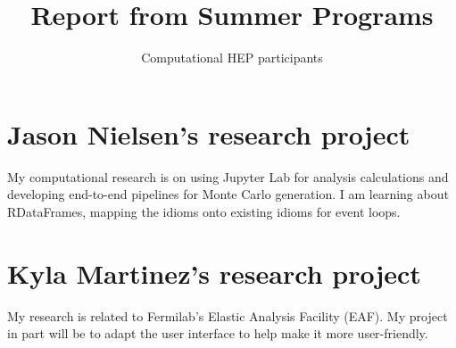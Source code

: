 \documentclass[12pt]{article}
\title{Report from Summer Programs}
\author{Computational HEP participants}
\begin{document}
\maketitle
\section{Jason Nielsen's research project}

My computational research is on using Jupyter Lab for analysis calculations and developing end-to-end pipelines for Monte Carlo generation.
I am learning about RDataFrames, mapping the idioms onto existing idioms for event loops.

\section{Kyla Martinez's research project}
My research is related to Fermilab's Elastic Analysis Facility (EAF). 
My project in part will be to adapt the user interface to help make it more user-friendly. 
\end{document}

